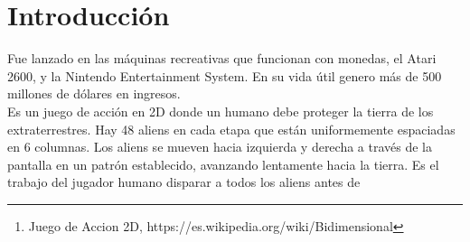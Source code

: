 \documentclass[a4paper]{article} %
\begin{document}
    \vfill
\newpage
\tableofcontents
\newpage
\clearpage
\begin{abstract}
Fue lanzado en las máquinas recreativas que funcionan con monedas como en la figura (\ref{fig:ejemplo}), el Atari 2600, y la Nintendo Entertainment System. En su vida útil genero más de 500 millones de dólares en ingresos.\\

Es un juego de acción en 2D\footnote{Juego de Accion 2D, https://es.wikipedia.org/wiki/Bidimensional} donde un humano debe proteger la tierra de los extraterrestres. Hay 48 aliens en cada etapa que están uniformemente espaciadas en 6 columnas. Los aliens se mueven hacia izquierda y derecha a través de la pantalla en un patrón establecido, avanzando lentamente hacia la tierra. Es el trabajo del jugador humano disparar a todos los aliens antes de\end{abstract}
\section{Introducci\'on}
Fue lanzado en las máquinas recreativas que funcionan con monedas, el Atari 2600, y la Nintendo Entertainment System. En su vida útil genero más de 500 millones de dólares en ingresos.\\
Es un juego de acción en 2D donde un humano debe proteger la tierra de los extraterrestres. Hay 48 aliens en cada etapa que están uniformemente espaciadas en 6 columnas. Los aliens se mueven hacia izquierda y derecha a través de la pantalla en un patrón establecido, avanzando lentamente hacia la tierra. Es el trabajo del jugador humano disparar a todos los aliens antes de
\end{document}
